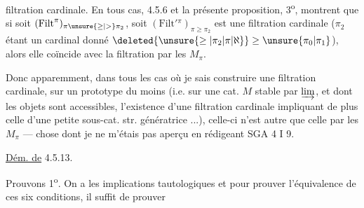 filtration cardinale.  En tous cas, 4.5.6 et la présente proposition, 3\textsuperscript{o}, montrent que si soit $(\mathrm{Filt}^\pi)_{\pi\unsure{\geq|>}\pi_2}$, soit $(\mathrm{Filt}'{}^\pi)_{\pi\geq\pi_2}$ est une filtration cardinale ($\pi_2$ étant un cardinal donné $\deleted{\unsure{\geq|\pi_2|\pi|\aleph}}\geq\unsure{\pi_0|\pi_1}$), alors elle coïncide avec la filtration par les $M_\pi$.

Donc apparemment, dans tous les cas où je sais construire une filtration cardinale, sur un prototype du moins (i.e. sur une cat. $M$ stable par  $\varinjlim$,  et dont les objets sont accessibles\unsure{\}|)},   l'existence d'une filtration cardinale impliquant de plus celle d'une petite sous-cat. str. génératrice ...), celle-ci n'est autre que celle par les $M_\pi$ --- chose dont je ne m'étais pas aperçu en rédigeant SGA 4 I 9.

\uline{Dém. de} 4.5.13.

Prouvons 1\textsuperscript{o}. On a les implications tautologiques
et pour prouver l'équivalence de ces six conditions, il suffit de prouver
